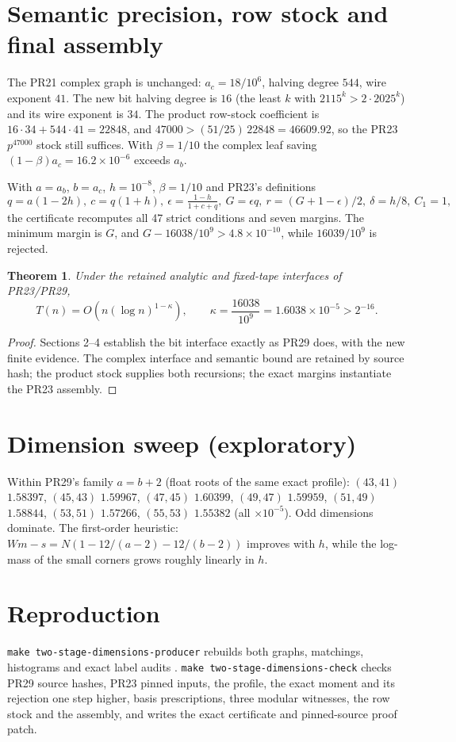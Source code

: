 \documentclass[11pt]{article}
\newtheorem{theorem}{Theorem}
\begin{document}
\section{Semantic precision, row stock and final assembly}
The PR21 complex graph is unchanged: $a_c=18/10^6$, halving degree $544$,
wire exponent $41$. The new bit halving degree is $16$ (the least $k$ with
$2115^k>2\cdot2025^k$) and its
wire exponent is $34$. The product row-stock coefficient is
$16\cdot34+544\cdot41=22848$, and $47000>(51/25)\,22848=46609.92$, so the
PR23 $p^{47000}$ stock still suffices. With $\beta=1/10$ the complex leaf
saving $(1-\beta)a_c=16.2\times10^{-6}$ exceeds $a_b$.

With $a=a_b$, $b=a_c$, $h=10^{-8}$, $\beta=1/10$ and PR23's definitions
\[
 q=a(1-2h),\ c=q(1+h),\ \epsilon=\tfrac{1-h}{1+c+q},\ G=\epsilon q,\
 r=(G+1-\epsilon)/2,\ \delta=h/8,\ C_1=1,
\]
the certificate recomputes all 47 strict conditions and seven margins.
The minimum margin is $G$, and $G-16038/10^9>4.8\times10^{-10}$, while
$16039/10^9$ is rejected.

\begin{theorem}
Under the retained analytic and fixed-tape interfaces of PR23/PR29,
\[
 T(n)=O\!\left(n(\log n)^{1-\kappa}\right),\qquad
 \kappa=\frac{16038}{10^9}=1.6038\times10^{-5}>2^{-16}.
\]
\end{theorem}
\begin{proof}
Sections 2--4 establish the bit interface exactly as PR29 does, with the
new finite evidence. The complex interface and semantic bound are retained
by source hash; the product stock supplies both recursions; the exact
margins instantiate the PR23 assembly.
\end{proof}

\section{Dimension sweep (exploratory)}
Within PR29's family $a=b+2$ (float roots of the same exact profile):
$(43,41)$ $1.58397$, $(45,43)$ $1.59967$, $(47,45)$ $1.60399$,
$(49,47)$ $1.59959$, $(51,49)$ $1.58844$, $(53,51)$ $1.57266$,
$(55,53)$ $1.55382$ (all $\times10^{-5}$). Odd dimensions dominate. The
first-order heuristic: $Wm-s=N(1-12/(a-2)-12/(b-2))$ improves with $h$, while
the log-mass of the small corners grows roughly linearly in $h$.

\section{Reproduction}
\texttt{make two-stage-dimensions-producer} rebuilds both graphs, matchings,
histograms and exact label audits .
\texttt{make two-stage-dimensions-check} checks PR29 source hashes, PR23 pinned
inputs, the profile, the exact moment and its rejection one step higher,
basis prescriptions, three modular witnesses, the row stock and the
assembly, and writes the exact certificate and pinned-source proof patch.
\end{document}
